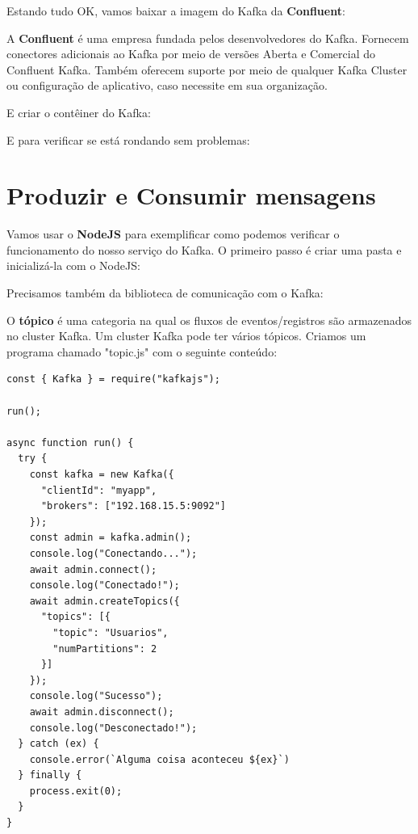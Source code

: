 \documentclass[a4paper,11pt]{article}
\begin{document}
Estando tudo OK, vamos baixar a imagem do Kafka da \textbf{Confluent}: \\

A \textbf{Confluent} é uma empresa fundada pelos desenvolvedores do Kafka. Fornecem conectores adicionais ao Kafka por meio de versões Aberta e Comercial do Confluent Kafka. Também oferecem suporte por meio de qualquer Kafka Cluster ou configuração de aplicativo, caso necessite em sua organização.

E criar o contêiner do Kafka: \\

E para verificar se está rondando sem problemas: \\

\section{Produzir e Consumir mensagens}
Vamos usar o \textbf{NodeJS} para exemplificar como podemos verificar o funcionamento do nosso serviço do Kafka. O primeiro passo é criar uma pasta e inicializá-la com o NodeJS:

Precisamos também da biblioteca de comunicação com o Kafka:

O \textbf{tópico} é uma categoria na qual os fluxos de eventos/registros são armazenados no cluster Kafka. Um cluster Kafka pode ter vários tópicos. Criamos um programa chamado "topic.js" com o seguinte conteúdo:
\begin{lstlisting}[]
const { Kafka } = require("kafkajs");

run();

async function run() {
  try {
    const kafka = new Kafka({
      "clientId": "myapp",
      "brokers": ["192.168.15.5:9092"]
    });
    const admin = kafka.admin();
    console.log("Conectando...");
    await admin.connect();
    console.log("Conectado!");
    await admin.createTopics({
      "topics": [{
        "topic": "Usuarios",
        "numPartitions": 2
      }]
    });
    console.log("Sucesso");
    await admin.disconnect();
    console.log("Desconectado!");
  } catch (ex) {
    console.error(`Alguma coisa aconteceu ${ex}`)
  } finally {
    process.exit(0);
  }
}
\end{lstlisting}
\end{document}

